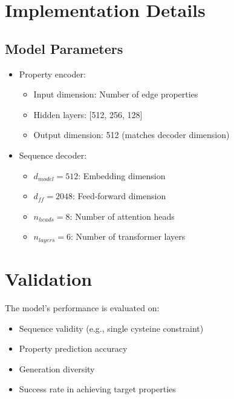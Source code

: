 \documentclass[11pt]{article}
\begin{document}
\section{Implementation Details}

\subsection{Model Parameters}
\begin{itemize}
    \item Property encoder:
        \begin{itemize}
            \item Input dimension: Number of edge properties
            \item Hidden layers: [512, 256, 128]
            \item Output dimension: 512 (matches decoder dimension)
        \end{itemize}
    \item Sequence decoder:
        \begin{itemize}
            \item $d_{model} = 512$: Embedding dimension
            \item $d_{ff} = 2048$: Feed-forward dimension
            \item $n_{heads} = 8$: Number of attention heads
            \item $n_{layers} = 6$: Number of transformer layers
        \end{itemize}
\end{itemize}

\section{Validation}
The model's performance is evaluated on:
\begin{itemize}
    \item Sequence validity (e.g., single cysteine constraint)
    \item Property prediction accuracy
    \item Generation diversity
    \item Success rate in achieving target properties
\end{itemize}
\end{document}
